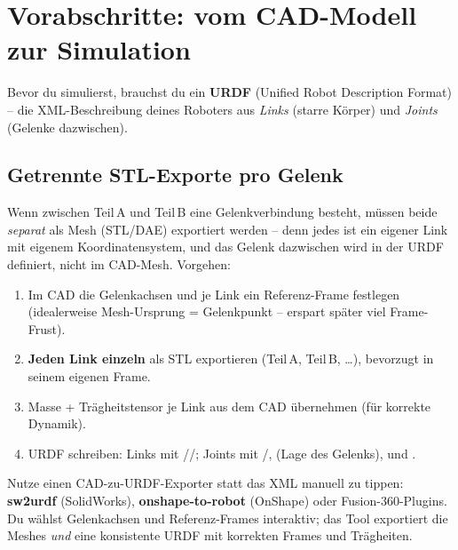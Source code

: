 
\chapter{Vorabschritte: vom CAD-Modell zur Simulation}
\label{ch:cad_urdf}

Bevor du simulierst, brauchst du ein \textbf{URDF} (Unified Robot Description
Format) -- die XML-Beschreibung deines Roboters aus \emph{Links} (starre
Körper) und \emph{Joints} (Gelenke dazwischen).

\section{Getrennte STL-Exporte pro Gelenk}
Wenn zwischen Teil\,A und Teil\,B eine Gelenkverbindung besteht, müssen beide
\emph{separat} als Mesh (STL/DAE) exportiert werden -- denn jedes ist ein
eigener Link mit eigenem Koordinatensystem, und das Gelenk dazwischen wird in
der URDF definiert, nicht im CAD-Mesh. Vorgehen:
\begin{enumerate}
\item Im CAD die Gelenkachsen und je Link ein Referenz-Frame festlegen
  (idealerweise Mesh-Ursprung = Gelenkpunkt -- erspart später viel Frame-Frust).
\item \textbf{Jeden Link einzeln} als STL exportieren (Teil\,A, Teil\,B,
  \dots), bevorzugt in seinem eigenen Frame.
\item Masse + Trägheitstensor je Link aus dem CAD übernehmen (für korrekte
  Dynamik).
\item URDF schreiben: Links mit //;
  Joints mit /,  (Lage des Gelenks),
   und .
\end{enumerate}

\begin{infobox}[title=Automatisierung -- nicht von Hand schreiben]
Nutze einen CAD-zu-URDF-Exporter statt das XML manuell zu tippen:
\textbf{sw2urdf} (SolidWorks), \textbf{onshape-to-robot} (OnShape) oder
Fusion-360-Plugins. Du wählst Gelenkachsen und Referenz-Frames interaktiv; das
Tool exportiert die Meshes \emph{und} eine konsistente URDF mit korrekten
Frames und Trägheiten.
\end{infobox}

